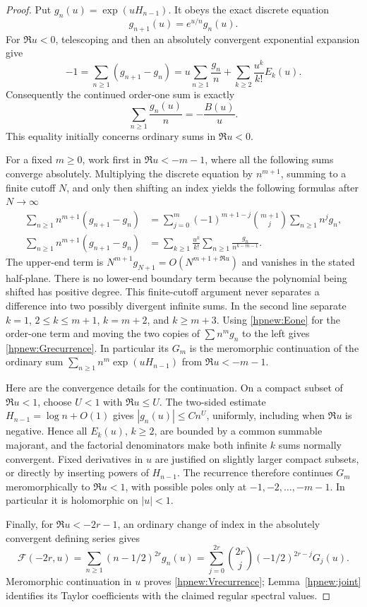\documentclass[11pt,a4paper]{article}
\numberwithin{equation}{section}
\theoremstyle{definition}
\theoremstyle{remark}
\begin{document}
\begin{proof}
Put $g_n(u)=\exp(uH_{n-1})$. It obeys the exact discrete equation
\[
                  g_{n+1}(u)=e^{u/n}g_n(u).
\]
For $\Re u<0$, telescoping and then an absolutely convergent
exponential expansion give
\[
 -1=\sum_{n\ge1}(g_{n+1}-g_n)
   =u\sum_{n\ge1}\frac{g_n}{n}
                      +\sum_{k\ge2}\frac{u^k}{k!}E_k(u).
\]
Consequently the continued order-one sum is exactly
\begin{equation}\label{hpnew:Eone}
                \sum_{n\ge1}\frac{g_n(u)}n=-\frac{B(u)}u.
\end{equation}
This equality initially concerns ordinary sums in $\Re u<0$.

For a fixed $m\ge0$, work first in $\Re u<-m-1$, where all the
following sums converge absolutely. Multiplying the discrete equation
by $n^{m+1}$, summing to a finite cutoff $N$, and only then
shifting an index yields the following formulas after $N\to\infty$
\begin{align*}
 \sum_{n\ge1}n^{m+1}(g_{n+1}-g_n)
 &=\sum_{j=0}^{m}(-1)^{m+1-j}\binom{m+1}{j}
                                  \sum_{n\ge1}n^jg_n,\\
 \sum_{n\ge1}n^{m+1}(g_{n+1}-g_n)
 &=\sum_{k\ge1}\frac{u^k}{k!}
                                  \sum_{n\ge1}\frac{g_n}{n^{k-m-1}}.
\end{align*}
The upper-end term is $N^{m+1}g_{N+1}=O(N^{m+1+\Re u})$ and
vanishes in the stated half-plane. There is no lower-end boundary
term because the polynomial being shifted has positive degree.
This finite-cutoff argument never separates a difference into two
possibly divergent infinite sums. In the second line separate $k=1$,
$2\le k\le m+1$, $k=m+2$, and $k\ge m+3$.
Using \eqref{hpnew:Eone} for the order-one term and moving the two
copies of $\sum n^mg_n$ to the left gives
\eqref{hpnew:Grecurrence}. In particular its $G_m$ is the
meromorphic continuation of the ordinary sum
$\sum_{n\ge1}n^m\exp(uH_{n-1})$ from $\Re u<-m-1$.

Here are the convergence details for the continuation. On a compact
subset of $\Re u<1$, choose $U<1$ with $\Re u\le U$.
The two-sided estimate $H_{n-1}=\log n+O(1)$ gives
$|g_n(u)|\le Cn^U$, uniformly, including when $\Re u$ is negative. Hence all $E_k(u)$, $k\ge2$, are
bounded by a common summable majorant, and the factorial denominators
make both infinite $k$ sums normally convergent. Fixed derivatives in
$u$ are justified on slightly larger compact subsets, or directly by
inserting powers of $H_{n-1}$. The recurrence therefore continues
$G_m$ meromorphically to $\Re u<1$, with possible poles only at
$-1,-2,\ldots,-m-1$. In particular it is holomorphic on $|u|<1$.

Finally, for $\Re u<-2r-1$, an ordinary change of index in the
absolutely convergent defining series gives
\[
 \mathscr F(-2r,u)=\sum_{n\ge1}(n-1/2)^{2r}g_n(u)
   =\sum_{j=0}^{2r}\binom{2r}{j}(-1/2)^{2r-j}G_j(u).
\]
Meromorphic continuation in $u$ proves \eqref{hpnew:Vrecurrence};
Lemma~\ref{hpnew:joint} identifies its Taylor coefficients with the
claimed regular spectral values.
\end{proof}
\end{document}
